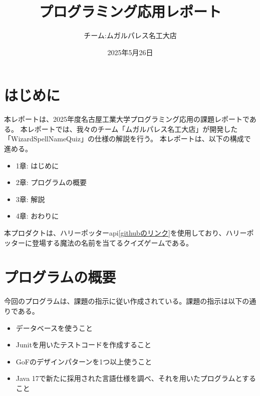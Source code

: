 \documentclass[uplatex,dvipdfmx,a4paper]{jsarticle}
\title{プログラミング応用レポート}
\author{チーム:ムガルパレス名工大店}
\date{2025年5月26日}
\begin{document}
\maketitle

\section{はじめに}
本レポートは、2025年度名古屋工業大学プログラミング応用の課題レポートである。
本レポートでは、我々のチーム「ムガルパレス名工大店」が開発した「WizardSpellNameQuiz」の仕様の解説を行う。
本レポートは、以下の構成で進める。
\begin{itemize}
  \item 1章: はじめに
  \item 2章: プログラムの概要
  \item 3章: 解説
  \item 4章: おわりに
\end{itemize}
本プロダクトは、ハリーポッターapi\href{https://github.com/KostaSav/hp-api}{[githubのリンク]}を使用しており、ハリーポッターに登場する魔法の名前を当てるクイズゲームである。

\section{プログラムの概要}

今回のプログラムは、課題の指示に従い作成されている。課題の指示は以下の通りである。
\begin{itemize}
  \item データベースを使うこと
  \item Junitを用いたテストコードを作成すること
  \item GoFのデザインパターンを1つ以上使うこと
  \item Java 17で新たに採用された言語仕様を調べ、それを用いたプログラムとすること%
  \end{itemize}
\end{document}
